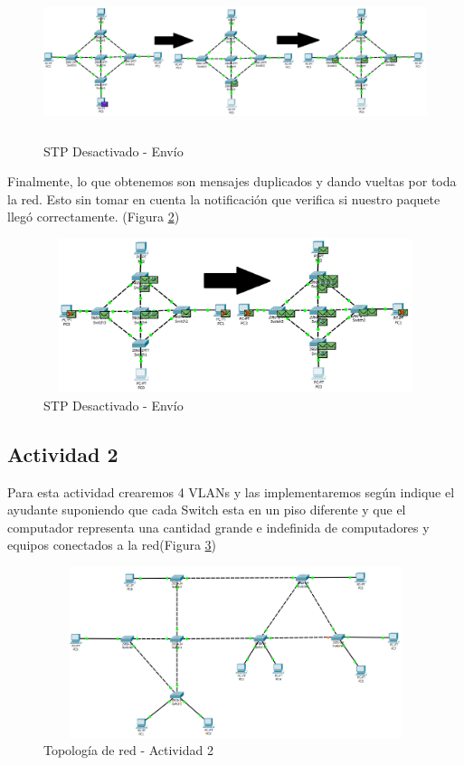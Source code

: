 \documentclass{article}
\begin{document}
\begin{figure}[h!]
\centering
\includegraphics[height=4.5cm,width=12cm]{mensaje4.png}
\caption{STP Desactivado - Envío}
\label{fig:msj2}
\end{figure}
\newpage
Finalmente, lo que obtenemos son mensajes duplicados y dando vueltas por toda la red. Esto sin tomar en cuenta la notificación que verifica si nuestro paquete llegó correctamente. (Figura \ref{fig:msj3})
\begin{figure}[h!]
\centering
\includegraphics[height=4.5cm,width=12cm]{mensaje7.png}
\caption{STP Desactivado - Envío}
\label{fig:msj3}
\end{figure}

\newpage
\subsection{Actividad 2\vspace{0.3cm}}
Para esta actividad crearemos 4 VLANs y las implementaremos según indique el ayudante suponiendo que cada Switch esta en un piso diferente y que el computador representa una cantidad grande e indefinida de computadores y equipos conectados a la red(Figura \ref{fig:top2})

\begin{figure}[h!]
\centering
\includegraphics[height=5cm,width=12cm]{top2.png}
\caption{Topología de red - Actividad 2}
\label{fig:top2}
\end{figure}
\end{document}
